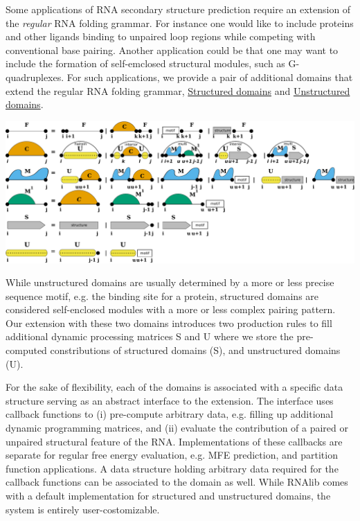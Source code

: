 Some applications of R\+NA secondary structure prediction require an extension of the {\itshape regular} R\+NA folding grammar. For instance one would like to include proteins and other ligands binding to unpaired loop regions while competing with conventional base pairing. Another application could be that one may want to include the formation of self-\/emclosed structural modules, such as G-\/quadruplexes. For such applications, we provide a pair of additional domains that extend the regular R\+NA folding grammar, \hyperlink{group__domains__struc}{Structured domains} and \hyperlink{group__domains__up}{Unstructured domains}.

 
\begin{DoxyImageNoCaption}
  \mbox{\includegraphics[width=\textwidth,height=\textheight/2,keepaspectratio=true]{GCrecursion}}
\end{DoxyImageNoCaption}


While unstructured domains are usually determined by a more or less precise sequence motif, e.\+g. the binding site for a protein, structured domains are considered self-\/enclosed modules with a more or less complex pairing pattern. Our extension with these two domains introduces two production rules to fill additional dynamic processing matrices {\ttfamily S} and {\ttfamily U} where we store the pre-\/computed constributions of structured domains ({\ttfamily S}), and unstructured domains ({\ttfamily U}).

For the sake of flexibility, each of the domains is associated with a specific data structure serving as an abstract interface to the extension. The interface uses callback functions to (i) pre-\/compute arbitrary data, e.\+g. filling up additional dynamic programming matrices, and (ii) evaluate the contribution of a paired or unpaired structural feature of the R\+NA. Implementations of these callbacks are separate for regular free energy evaluation, e.\+g. M\+FE prediction, and partition function applications. A data structure holding arbitrary data required for the callback functions can be associated to the domain as well. While R\+N\+Alib comes with a default implementation for structured and unstructured domains, the system is entirely user-\/costomizable. 